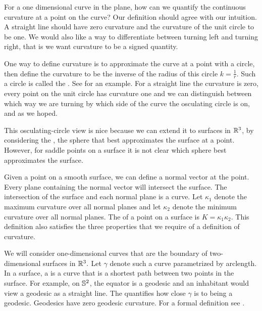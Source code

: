 

For a one dimensional curve in the plane,
how can we quantify the continuous curvature at a point on the curve?
Our definition should agree with our intuition. A straight line
should have zero curvature and the curvature of the unit circle to be one.
We would also like a way to differentiate
between turning left and turning right, that is we want curvature to be a signed quantity.

One way to define curvature is to approximate the curve at a point with a circle,
 then define the curvature to be the inverse of the radius of this circle $k=\frac{1}{r}$.
Such a circle is called the .
See  for an example.
For a straight line the curvature is zero, 
every point on the unit circle has curvature one 
and we can distinguish between
which way we are turning by which side of the curve the osculating circle is on,
 and as we hoped.
 

This osculating-circle view is nice because we can extend it
to  surfaces in $\mathbb{R}^3$, by considering the ,
 the sphere that best approximates the surface at a point.
However, for saddle points on a surface it is not clear which sphere
best approximates the surface.


Given a point on a smooth surface, we can define a normal vector at the point.
Every plane containing the normal vector will intersect the surface.
The intersection of the surface and each normal plane is a curve. 
Let $\kappa_1$ denote the maximum curvature over all normal planes
and let $\kappa_2$ denote the minimum curvature over all normal planes.
The  of a point on a surface is
$K=\kappa_1\kappa_2.$
This definition also satisfies the three properties that we require of a definition of
curvature.



We will consider one-dimensional curves that are the boundary of two-dimensional
surfaces in $\mathbb{R}^3.$ Let $\gamma$ denote such a curve parametrized by arclength.
In a surface, a  is a curve that is a shortest path
between two points in the surface. 
For example, on $\mathbb{S}^2$, the equator is a geodesic
and an inhabitant would view a geodesic as a straight line. 
The  quantifies how close $\gamma$ is to being a geodesic.
Geodesics have zero geodesic curvature. 
For a formal definition see \cite{doc76}.




